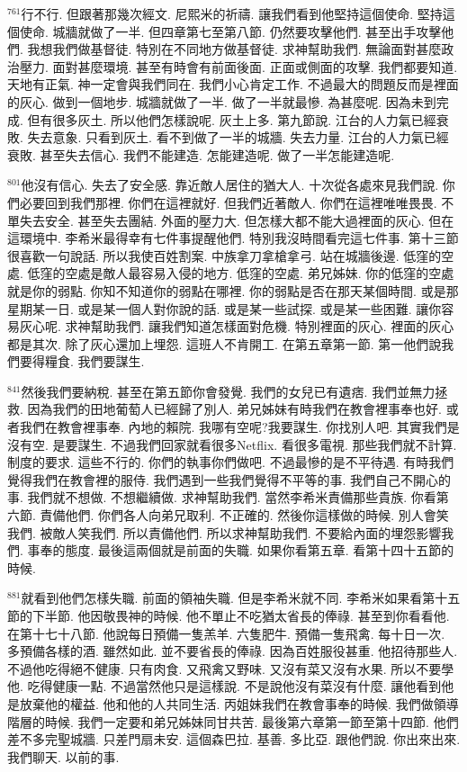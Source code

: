 \documentclass{book}
\begin{document}
$^{761}$行不行.
但跟著那幾次經文.
尼熙米的祈禱.
讓我們看到他堅持這個使命.
堅持這個使命.
城牆就做了一半.
但四章第七至第八節.
仍然要攻擊他們.
甚至出手攻擊他們.
我想我們做基督徒.
特別在不同地方做基督徒.
求神幫助我們.
無論面對甚麼政治壓力.
面對甚麼環境.
甚至有時會有前面後面.
正面或側面的攻擊.
我們都要知道.
天地有正氣.
神一定會與我們同在.
我們小心肯定工作.
不過最大的問題反而是裡面的灰心.
做到一個地步.
城牆就做了一半.
做了一半就最慘.
為甚麼呢.
因為未到完成.
但有很多灰土.
所以他們怎樣說呢.
灰土上多.
第九節說.
江台的人力氣已經衰敗.
失去意象.
只看到灰土.
看不到做了一半的城牆.
失去力量.
江台的人力氣已經衰敗.
甚至失去信心.
我們不能建造.
怎能建造呢.
做了一半怎能建造呢.

$^{801}$他沒有信心.
失去了安全感.
靠近敵人居住的猶大人.
十次從各處來見我們說.
你們必要回到我們那裡.
你們在這裡就好.
但我們近著敵人.
你們在這裡唯唯畏畏.
不單失去安全.
甚至失去團結.
外面的壓力大.
但怎樣大都不能大過裡面的灰心.
但在這環境中.
李希米最得幸有七件事提醒他們.
特別我沒時間看完這七件事.
第十三節很喜歡一句說話.
所以我使百姓割案.
中族拿刀拿槍拿弓.
站在城牆後邊.
低窪的空處.
低窪的空處是敵人最容易入侵的地方.
低窪的空處.
弟兄姊妹.
你的低窪的空處就是你的弱點.
你知不知道你的弱點在哪裡.
你的弱點是否在那天某個時間.
或是那星期某一日.
或是某一個人對你說的話.
或是某一些試探.
或是某一些困難.
讓你容易灰心呢.
求神幫助我們.
讓我們知道怎樣面對危機.
特別裡面的灰心.
裡面的灰心都是其次.
除了灰心還加上埋怨.
這班人不肯開工.
在第五章第一節.
第一他們說我們要得糧食.
我們要謀生.

$^{841}$然後我們要納稅.
甚至在第五節你會發覺.
我們的女兒已有遺痞.
我們並無力拯救.
因為我們的田地葡萄人已經歸了別人.
弟兄姊妹有時我們在教會裡事奉也好.
或者我們在教會裡事奉.
內地的賴院.
我哪有空呢?我要謀生.
你找別人吧.
其實我們是沒有空.
是要謀生.
不過我們回家就看很多Netflix.
看很多電視.
那些我們就不計算.
制度的要求.
這些不行的.
你們的執事你們做吧.
不過最慘的是不平待遇.
有時我們覺得我們在教會裡的服侍.
我們遇到一些我們覺得不平等的事.
我們自己不開心的事.
我們就不想做.
不想繼續做.
求神幫助我們.
當然李希米責備那些貴族.
你看第六節.
責備他們.
你們各人向弟兄取利.
不正確的.
然後你這樣做的時候.
別人會笑我們.
被敵人笑我們.
所以責備他們.
所以求神幫助我們.
不要給內面的埋怨影響我們.
事奉的態度.
最後這兩個就是前面的失職.
如果你看第五章.
看第十四十五節的時候.

$^{881}$就看到他們怎樣失職.
前面的領袖失職.
但是李希米就不同.
李希米如果看第十五節的下半節.
他因敬畏神的時候.
他不單止不吃猶太省長的俸祿.
甚至到你看看他.
在第十七十八節.
他說每日預備一隻羔羊.
六隻肥牛.
預備一隻飛禽.
每十日一次.
多預備各樣的酒.
雖然如此.
並不要省長的俸祿.
因為百姓服役甚重.
他招待那些人.
不過他吃得絕不健康.
只有肉食.
又飛禽又野味.
又沒有菜又沒有水果.
所以不要學他.
吃得健康一點.
不過當然他只是這樣說.
不是說他沒有菜沒有什麼.
讓他看到他是放棄他的權益.
他和他的人共同生活.
丙姐妹我們在教會事奉的時候.
我們做領導階層的時候.
我們一定要和弟兄姊妹同甘共苦.
最後第六章第一節至第十四節.
他們差不多完聖城牆.
只差門扇未安.
這個森巴拉.
基善.
多比亞.
跟他們說.
你出來出來.
我們聊天.
以前的事.
\end{document}
